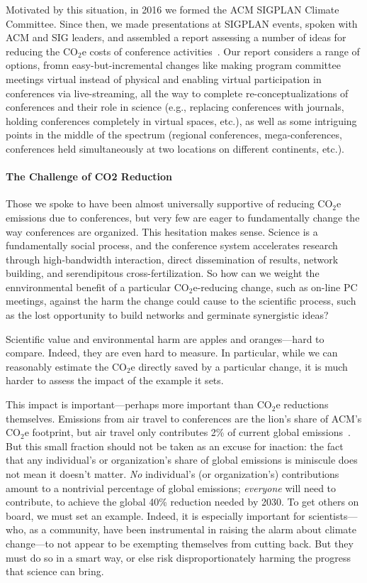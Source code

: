 \documentclass[12pt]{article}
\newcommand{\COtwoE}{CO$_2$e}
\newcommand{\SECTION}{\paragraph*}
\begin{document}
Motivated by this situation, in 2016 we formed the ACM SIGPLAN Climate
Committee. Since then, we made presentations at SIGPLAN events, spoken with
ACM and SIG leaders, and assembled a report assessing a number of ideas for
reducing the \COtwoE{} costs of conference
activities~\cite{ClimateCommitteReport}.  Our report considers a range of
options, fromn easy-but-incremental changes like making program committee
meetings virtual instead of physical and enabling virtual participation in
conferences via live-streaming, all the way to complete
re-conceptualizations of conferences and their role in science (e.g.,
replacing conferences with journals, holding conferences completely in
virtual spaces, etc.), as well as some intriguing points in the middle of
the spectrum (regional conferences, mega-conferences, conferences held
simultaneously at two locations on different continents, etc.).

\SECTION{The Challenge of CO2 Reduction}

Those we spoke to have been almost universally supportive of reducing
\COtwoE{} emissions due to conferences, but very few are eager to
fundamentally change the way conferences are organized. This hesitation
makes sense. Science is a fundamentally social process, and the conference
system accelerates research through high-bandwidth interaction, direct
dissemination of results, network building, and serendipitous
cross-fertilization.  So how can we weight the ennvironmental benefit of a
particular \COtwoE-reducing change, such as on-line PC meetings, against the
harm the change could cause to the scientific process, such as the lost
opportunity to build networks and germinate synergistic ideas?

Scientific value and environmental harm are apples and oranges---hard to
compare.  Indeed, they are even hard to measure. In particular, while we can
reasonably estimate the \COtwoE{} directly saved by a particular change, it
is much harder to assess the impact of the example it sets.

This impact is important---perhaps more important than \COtwoE{} reductions
themselves. Emissions from air travel to conferences are the lion's share of
ACM's \COtwoE{} footprint, but air travel only contributes 2\% of current
global emissions~\cite{emissions}. But this small fraction should not be
taken as an excuse for inaction: the fact that any individual's or
organization's share of global emissions is miniscule does not mean it
doesn't matter. {\em No} individual's (or organization's) contributions
amount to a nontrivial percentage of global emissions; {\em everyone} will
need to contribute, to achieve the global 40\% reduction needed by 2030. To
get others on board, we must set an example. Indeed, it is especially
important for scientists---who, as a community, have been instrumental in
raising the alarm about climate change---to not appear to be exempting
themselves from cutting back.  But they must do so in a smart way, or else
risk disproportionately harming the progress that science can bring.
\end{document}
